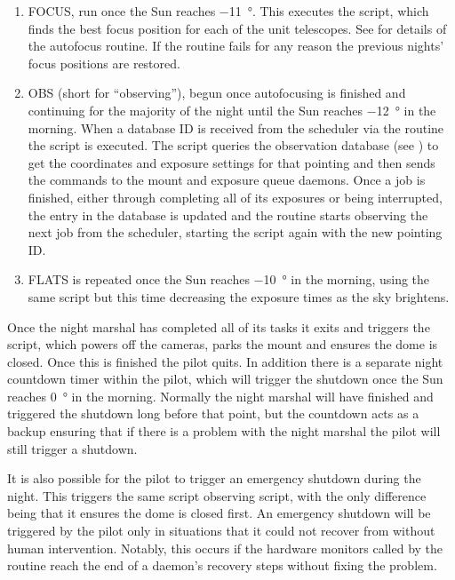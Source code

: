 \begin{colsection}
\begin{enumerate}
\item FOCUS, run once the Sun reaches \SI{-11}{\degree}. This executes the  script, which finds the best focus position for each of the unit telescopes. See  for details of the autofocus routine. If the routine fails for any reason the previous nights' focus positions are restored.

\item OBS (short for ``observing''), begun once autofocusing is finished and continuing for the majority of the night until the Sun reaches \SI{-12}{\degree} in the morning. When a database ID is received from the scheduler via the  routine the  script is executed. The script queries the observation database (see ) to get the coordinates and exposure settings for that pointing and then sends the commands to the mount and exposure queue daemons. Once a job is finished, either through completing all of its exposures or being interrupted, the entry in the database is updated and the routine starts observing the next job from the scheduler, starting the  script again with the new pointing ID.\

\item FLATS is repeated once the Sun reaches \SI{-10}{\degree} in the morning, using the same script but this time decreasing the exposure times as the sky brightens.

\end{enumerate}

Once the night marshal has completed all of its tasks it exits and triggers the  script, which powers off the cameras, parks the mount and ensures the dome is closed. Once this is finished the pilot quits. In addition there is a separate night countdown timer within the pilot, which will trigger the shutdown once the Sun reaches \SI{0}{\degree} in the morning. Normally the night marshal will have finished and triggered the shutdown long before that point, but the countdown acts as a backup ensuring that if there is a problem with the night marshal the pilot will still trigger a shutdown.

\newpage

It is also possible for the pilot to trigger an emergency shutdown during the night. This triggers the same  script observing script, with the only difference being that it ensures the dome is closed first. An emergency shutdown will be triggered by the pilot only in situations that it could not recover from without human intervention. Notably, this occurs if the hardware monitors called by the  routine reach the end of a daemon's recovery steps without fixing the problem.

\end{colsection}

